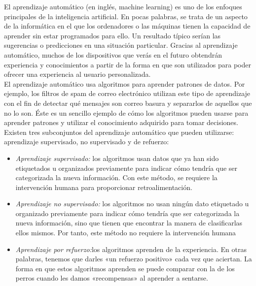     El aprendizaje automático (en inglés, machine learning) es uno de los enfoques principales de la inteligencia artificial. En pocas palabras, se trata de un aspecto de la informática en el que los ordenadores o las máquinas tienen la capacidad de aprender sin estar programados para ello. Un resultado típico serían las sugerencias o predicciones en una situación particular. Gracias al aprendizaje automático, muchos de los dispositivos que verás en el futuro obtendrán experiencia y conocimientos a partir de la forma en que son utilizados para poder ofrecer una experiencia al usuario personalizada.\\
    \newline
    El aprendizaje automático usa algoritmos para aprender patrones de datos. Por ejemplo, los filtros de spam de correo electrónico utilizan este tipo de aprendizaje con el fin de detectar qué mensajes son correo basura y separarlos de aquellos que no lo son. Éste es un sencillo ejemplo de cómo los algoritmos pueden usarse para aprender patrones y utilizar el conocimiento adquirido para tomar decisiones.\\
    \newline
    Existen tres subconjuntos del aprendizaje automático que pueden utilizarse: aprendizaje supervisado, no supervisado y de refuerzo:
    \begin{itemize}
        \item  \textit{Aprendizaje supervisado:} los algoritmos usan datos que ya han sido etiquetados u organizados previamente para indicar cómo tendría que ser categorizada la nueva información. Con este método, se requiere la intervención humana para proporcionar retroalimentación.
        \item  \textit{Aprendizaje no supervisado:} los algoritmos no usan ningún dato etiquetado u organizado previamente para indicar cómo tendría que ser categorizada la nueva información, sino que tienen que encontrar la manera de clasificarlas ellos mismos. Por tanto, este método no requiere la intervención humana
        \item  \textit{Aprendizaje por refuerzo:}los algoritmos aprenden de la experiencia. En otras palabras, tenemos que darles «un refuerzo positivo» cada vez que aciertan. La forma en que estos algoritmos aprenden se puede comparar con la de los perros cuando les damos «recompensas» al aprender a sentarse.
    \end{itemize}
    
